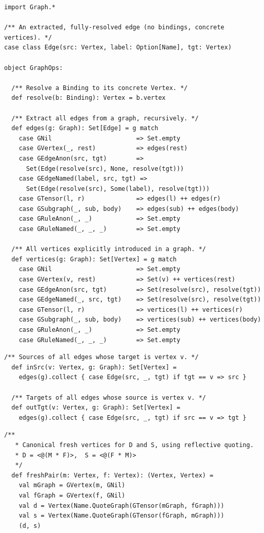 \documentclass[11pt, a4paper]{article}
\theoremstyle{definition}
\theoremstyle{plain}
\theoremstyle{remark}
\begin{document}
\begin{lstlisting}[style=scala, caption={Edge extraction}]
import Graph.*

/** An extracted, fully-resolved edge (no bindings, concrete vertices). */
case class Edge(src: Vertex, label: Option[Name], tgt: Vertex)

object GraphOps:

  /** Resolve a Binding to its concrete Vertex. */
  def resolve(b: Binding): Vertex = b.vertex

  /** Extract all edges from a graph, recursively. */
  def edges(g: Graph): Set[Edge] = g match
    case GNil                       => Set.empty
    case GVertex(_, rest)           => edges(rest)
    case GEdgeAnon(src, tgt)        =>
      Set(Edge(resolve(src), None, resolve(tgt)))
    case GEdgeNamed(label, src, tgt) =>
      Set(Edge(resolve(src), Some(label), resolve(tgt)))
    case GTensor(l, r)              => edges(l) ++ edges(r)
    case GSubgraph(_, sub, body)    => edges(sub) ++ edges(body)
    case GRuleAnon(_, _)            => Set.empty
    case GRuleNamed(_, _, _)        => Set.empty

  /** All vertices explicitly introduced in a graph. */
  def vertices(g: Graph): Set[Vertex] = g match
    case GNil                       => Set.empty
    case GVertex(v, rest)           => Set(v) ++ vertices(rest)
    case GEdgeAnon(src, tgt)        => Set(resolve(src), resolve(tgt))
    case GEdgeNamed(_, src, tgt)    => Set(resolve(src), resolve(tgt))
    case GTensor(l, r)              => vertices(l) ++ vertices(r)
    case GSubgraph(_, sub, body)    => vertices(sub) ++ vertices(body)
    case GRuleAnon(_, _)            => Set.empty
    case GRuleNamed(_, _, _)        => Set.empty
\end{lstlisting}

\begin{lstlisting}[style=scala, caption={Port set computation}]
  /** Sources of all edges whose target is vertex v. */
  def inSrc(v: Vertex, g: Graph): Set[Vertex] =
    edges(g).collect { case Edge(src, _, tgt) if tgt == v => src }

  /** Targets of all edges whose source is vertex v. */
  def outTgt(v: Vertex, g: Graph): Set[Vertex] =
    edges(g).collect { case Edge(src, _, tgt) if src == v => tgt }
\end{lstlisting}

\begin{lstlisting}[style=scala, caption={Fresh node generation}]
  /**
   * Canonical fresh vertices for D and S, using reflective quoting.
   * D = <@(M * F)>,  S = <@(F * M)>
   */
  def freshPair(m: Vertex, f: Vertex): (Vertex, Vertex) =
    val mGraph = GVertex(m, GNil)
    val fGraph = GVertex(f, GNil)
    val d = Vertex(Name.QuoteGraph(GTensor(mGraph, fGraph)))
    val s = Vertex(Name.QuoteGraph(GTensor(fGraph, mGraph)))
    (d, s)
\end{lstlisting}
\end{document}
